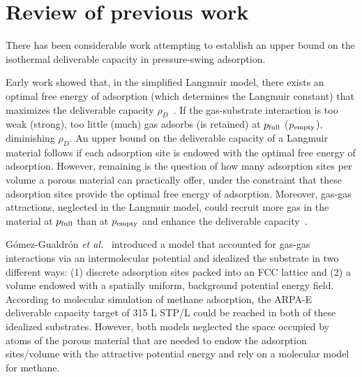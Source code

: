 \section{Review of previous work}
There has been considerable work attempting to establish an upper bound on the
isothermal deliverable capacity in pressure-swing adsorption.

Early work showed that, in the simplified Langmuir model, there exists an
optimal free energy of adsorption (which determines the Langmuir constant) that
maximizes the deliverable capacity
$\rho_D$~\cite{matranga1992storage,bhatia2006optimum,simon2014optimizing}. If
the gas-substrate interaction is too weak (strong), too little (much) gas
adsorbs (is retained) at $p_{\text{full}}$ ($p_{\text{empty}}$), diminishing $\rho_D$. An upper
bound on the deliverable capacity of a Langmuir material follows if each
adsorption site is endowed with the optimal free energy of adsorption. However,
remaining is the question of how many adsorption sites per volume a porous
material can practically offer, under the constraint that these adsorption
sites provide the optimal free energy of adsorption. Moreover, gas-gas
attractions, neglected in the Langmuir model, could recruit more gas in the
material at $p_{\text{full}}$ than at $p_{\text{empty}}$ and enhance the deliverable
capacity~\cite{simon2014optimizing}.

G\'omez-Gualdr\'on \emph{et al.}~\cite{gomez2017impact} introduced a model that
accounted for gas-gas interactions via an intermolecular potential and
idealized the substrate in two different ways: (1) discrete adsorption sites
packed into an FCC lattice and (2) a volume endowed with a spatially uniform,
background potential energy field. According to molecular simulation of methane
adsorption, the ARPA-E deliverable capacity target of 315 L STP/L could be
reached in both of these idealized substrates. However, both models neglected
the space occupied by atoms of the porous material that are needed to endow the
adsorption sites/volume with the attractive potential energy and rely on a
molecular model for methane.

